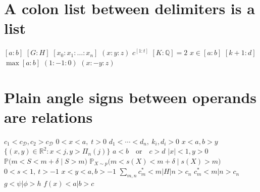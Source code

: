 \documentclass{article}
\begin{document}
\section{A colon list between delimiters is a list}
$[a:b]$ $[G\colon H]$ $[x_0:x_1:\dots:x_n]$ $(x:y:z)$ $c^{[1:t]}$ $[K:\mathbb{Q}]=2$ $x\in[a:b]$
$[k+1:d]$ $\max[a:b]$ $(1:-1:0)$ $(x:-y:z)$

\section{Plain angle signs between operands are relations}
$c_{1}<c_{\mathcal{D}},c_{2}>c_{\mathcal{D}}$ $0<x<a,\;t>0$ $d_{1}<\cdots<d_{n},\ k_{i},d_{i}>0$ $x<a,b>y$
$\{(x,y)\in\mathbb{R}^{2}:x<j,y>\Pi_{n}(j)\}$ $a<b\quad\textrm{or}\quad c>d$ $|x|<1,y>0$
$\mathbb{P}\big(m<S<m+\delta\mid S>m\big)$ $\mathbb{P}_{X\sim p}\big(m<s(X)<m+\delta\mid s(X)>m\big)$
$0<s<1,\ t>-1$ $x<y<a,b>-1$ $\sum_{m,n}c_m^*<m|H|n>c_n$ $c_m^*<m|n>c_n$ $g<\psi|\phi>h$ $f(x)<a|b>c$
\end{document}
